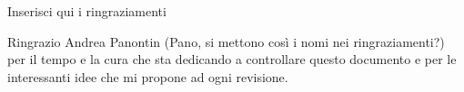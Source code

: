 \chapter*{}
Inserisci qui i ringraziamenti


Ringrazio Andrea Panontin (Pano, si mettono così i nomi nei ringraziamenti?) per il tempo e la cura che sta dedicando a controllare questo documento e per le interessanti idee che mi propone ad ogni revisione.